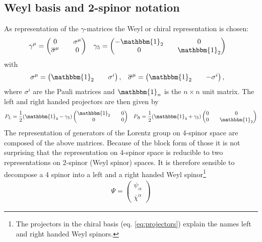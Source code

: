 \subsection{Weyl basis and 2-spinor notation}\label{sec:2spinor_notation}
As representation of the $\gamma$-matrices the Weyl or chiral representation is chosen:
\begin{align}
&\gamma^\mu = \begin{pmatrix}
0 && \sigma^\mu\\
\overline{\sigma}^\mu && 0
\end{pmatrix} &&
\gamma_5 = \begin{pmatrix}
-\mathbbm{1}_2 && 0\\
0 && \mathbbm{1}_2
\end{pmatrix}
\end{align}
with
\begin{align}
&\sigma^\mu = \begin{pmatrix}
\mathbbm{1}_2 && \sigma^i
\end{pmatrix}, &&
\overline{\sigma}^\mu = \begin{pmatrix}
\mathbbm{1}_2 && -\sigma^i
\end{pmatrix},\label{eq:Pauli}
\end{align}
where $\sigma^i$ are the Pauli matrices and $\mathbbm{1}_n$ is the $n \times n$ unit matrix. The left and right handed projectors are then given by
\begin{align}
P_L = \frac{1}{2}(\mathbbm{1}_4 - \gamma_5)\begin{pmatrix}
\mathbbm{1}_2 && 0\\
0 && 0
\end{pmatrix} && 
P_R = \frac{1}{2}(\mathbbm{1}_4 + \gamma_5)\begin{pmatrix}
0 && 0\\
0 && \mathbbm{1}_2
\end{pmatrix}\label{eq:projectors}
\end{align}
The representation of generators of the Lorentz group on 4-spinor space are composed of the above matrices. Because of the block form of those it is not surprising that the representation on 4-spinor space is reducible to two representations on 2-spinor (Weyl spinor) spaces. It is therefore sensible to decompose a 4 spinor into a left and a right handed Weyl spinor\footnote{The projectors in the chiral basis (eq. \ref{eq:projectors}) explain the names left and right handed Weyl spinors.}
\begin{align}
\Psi = \begin{pmatrix}
\psi_\alpha \\
\overline{\chi}^{\dot{\alpha}}
\end{pmatrix}
\end{align}
